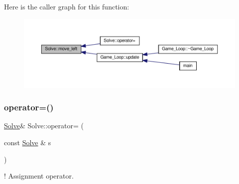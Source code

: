 Here is the caller graph for this function\+:\nopagebreak
\begin{figure}[H]
\begin{center}
\leavevmode
\includegraphics[width=350pt]{classSolve_a8226032eb1d4877539f417d4fab0efde_icgraph}
\end{center}
\end{figure}
\mbox{\label{classSolve_a2c0330bee4d1cafc5b3c7d5f7ba72697}} 
\subsubsection{\texorpdfstring{operator=()}{operator=()}}
{\footnotesize\ttfamily \hyperlink{classSolve}{Solve}\& Solve\+::operator= (\begin{DoxyParamCaption}\item[{const \hyperlink{classSolve}{Solve} \&}]{s }\end{DoxyParamCaption})\hspace{0.3cm}{\ttfamily [inline]}}



! Assignment operator. 


